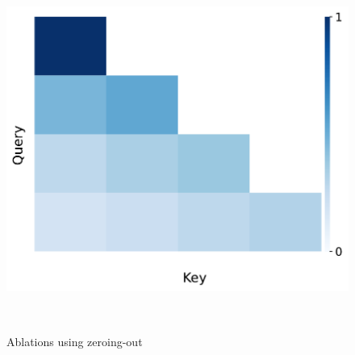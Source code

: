 \begin{figure}[t]
\begin{minipage}{0.33\textwidth}
  \end{minipage}~
  \begin{minipage}{0.33\textwidth}
      \centering
      \label{fig:appendix-ablation-massive-sup-zero-attn}
      \vspace{-.2em}
      \includegraphics[width=\linewidth]{Figures/figures_circuit/interventions/bos_zero_out/L0_zero_attn_weights.pdf}
  \end{minipage}~
  
  \caption{\small Ablations using zeroing-out
  }
  \label{figure:appendix-ablation-massive-zero}
\end{figure}

